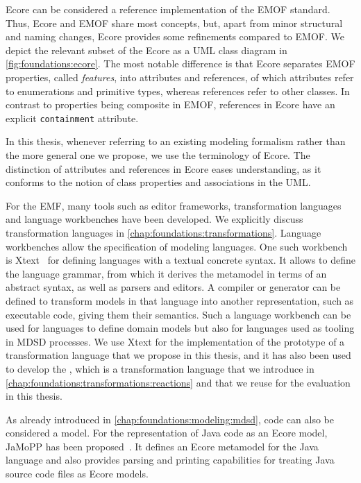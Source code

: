 Ecore can be considered a reference implementation of the \gls{EMOF} standard.
Thus, Ecore and \gls{EMOF} share most concepts, but, apart from minor structural and naming changes, Ecore provides some refinements compared to \gls{EMOF}.
We depict the relevant subset of the Ecore \metametamodel as a \gls{UML} class diagram in \autoref{fig:foundations:ecore}.
The most notable difference is that Ecore separates \gls{EMOF} properties, called \emph{features}, into attributes and references, of which attributes refer to enumerations and primitive types, whereas references refer to other classes.
In contrast to properties being composite in \gls{EMOF}, references in Ecore have an explicit \texttt{containment} attribute.

In this thesis, whenever referring to an existing modeling formalism rather than the more general one we propose, we use the terminology of Ecore.
The distinction of attributes and references in Ecore eases understanding, as it conforms to the notion of class properties and associations in the \gls{UML}.

For the \gls{EMF}, many tools such as editor frameworks, transformation languages and language workbenches have been developed.
We explicitly discuss transformation languages in \autoref{chap:foundations:transformations}.
Language workbenches allow the specification of modeling languages.
One such workbench is Xtext~\cite{bettini2016Xtext-Book} for defining languages with a textual concrete syntax.
It allows to define the language grammar, from which it derives the metamodel in terms of an abstract syntax, as well as parsers and editors.
A compiler or generator can be defined to transform models in that language into another representation, such as executable code, giving them their semantics.
Such a language workbench can be used for languages to define domain models but also for languages used as tooling in \gls{MDSD} processes.
We use Xtext for the implementation of the prototype of a transformation language that we propose in this thesis, and it has also been used to develop the \reactionslanguage, which is a transformation language that we introduce in \autoref{chap:foundations:transformations:reactions} and that we reuse for the evaluation in this thesis.

As already introduced in \autoref{chap:foundations:modeling:mdsd}, code can also be considered a model.
For the representation of Java code as an Ecore model, JaMoPP has been proposed~\cite{heidenreich2010jamopp-SLE, heidenreich2009jamopp-report}.
It defines an Ecore metamodel for the Java language and also provides parsing and printing capabilities for treating Java source code files as Ecore models.


